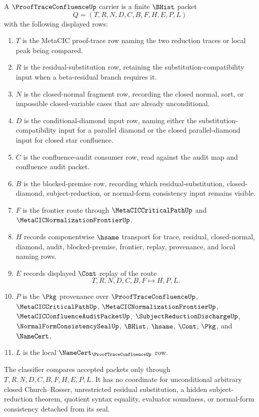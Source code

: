 \begin{definition}
\label{def:proof-trace-confluence-carrier}
A $\ProofTraceConfluenceUp$ carrier is a finite $\BHist$ packet
$$
Q=(T,R,N,D,C,B,F,H,E,P,L)
$$
with the following displayed rows:
\begin{enumerate}
\item $T$ is the MetaCIC proof-trace row naming the two reduction traces or local peak being compared.
\item $R$ is the residual-substitution row, retaining the substitution-compatibility input when a beta-residual branch requires it.
\item $N$ is the closed-normal fragment row, recording the closed normal, sort, or impossible closed-variable cases that are already unconditional.
\item $D$ is the conditional-diamond input row, naming either the substitution-compatibility input for a parallel diamond or the closed parallel-diamond input for closed star confluence.
\item $C$ is the confluence-audit consumer row, read against the audit map and confluence audit packet.
\item $B$ is the blocked-premise row, recording which residual-substitution, closed-diamond, subject-reduction, or normal-form consistency input remains visible.
\item $F$ is the frontier route through $\MetaCICCriticalPathUp$ and $\MetaCICNormalizationFrontierUp$.
\item $H$ records componentwise $\hsame$ transport for trace, residual, closed-normal, diamond, audit, blocked-premise, frontier, replay, provenance, and local naming rows.
\item $E$ records displayed $\Cont$ replay of the route
$$
T,R,N,D,C,B,F \longmapsto H,P,L .
$$
\item $P$ is the $\Pkg$ provenance over $\ProofTraceConfluenceUp$, $\MetaCICCriticalPathUp$, $\MetaCICNormalizationFrontierUp$, $\MetaCICConfluenceAuditPacketUp$, $\SubjectReductionDischargeUp$, $\NormalFormConsistencySealUp$, $\BHist$, $\hsame$, $\Cont$, $\Pkg$, and $\NameCert$.
\item $L$ is the local $\NameCert_{\ProofTraceConfluenceUp}$ row.
\end{enumerate}
The classifier compares accepted packets only through $T,R,N,D,C,B,F,H,E,P,L$. It has no coordinate for unconditional arbitrary closed Church--Rosser, unrestricted residual substitution, a hidden subject-reduction theorem, quotient syntax equality, evaluator soundness, or normal-form consistency detached from its seal.
\end{definition}

